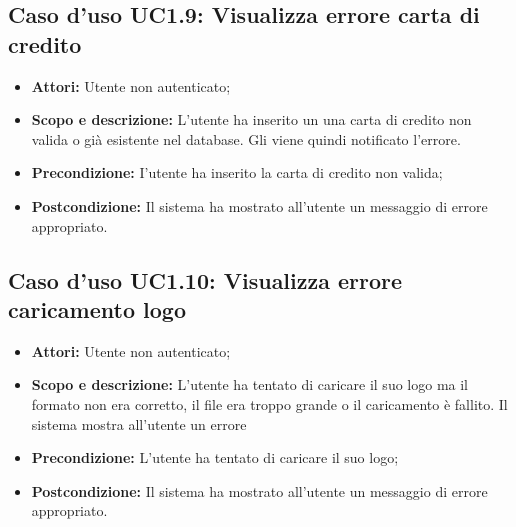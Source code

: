 \documentclass[12pt,a4paper,titlepage]{article}
\begin{document}
	\subsection{Caso d'uso UC1.9: Visualizza errore carta di credito}
	\label{UC1.9}
	\begin{itemize}
		\item \textbf{Attori: }Utente non autenticato;
		\item \textbf{Scopo e descrizione: }L'utente ha inserito un una carta di credito non valida o già esistente nel database. Gli viene quindi notificato l'errore.
		\item \textbf{Precondizione: }I'utente ha inserito la carta di credito non valida;
		\item \textbf{Postcondizione: }Il sistema ha mostrato all'utente un messaggio di errore appropriato.
	\end{itemize}
	\subsection{Caso d'uso UC1.10: Visualizza errore caricamento logo}
	\label{UC1.10}
	\begin{itemize}
		\item \textbf{Attori: }Utente non autenticato;
		\item \textbf{Scopo e descrizione: }L'utente ha tentato di caricare il suo logo ma il formato non era corretto, il file era troppo grande o il caricamento è fallito. Il sistema mostra all'utente un errore
		\item \textbf{Precondizione: }L'utente ha tentato di caricare il suo logo;
		\item \textbf{Postcondizione: }Il sistema ha mostrato all'utente un messaggio di errore appropriato.
	\end{itemize}
\end{document}

